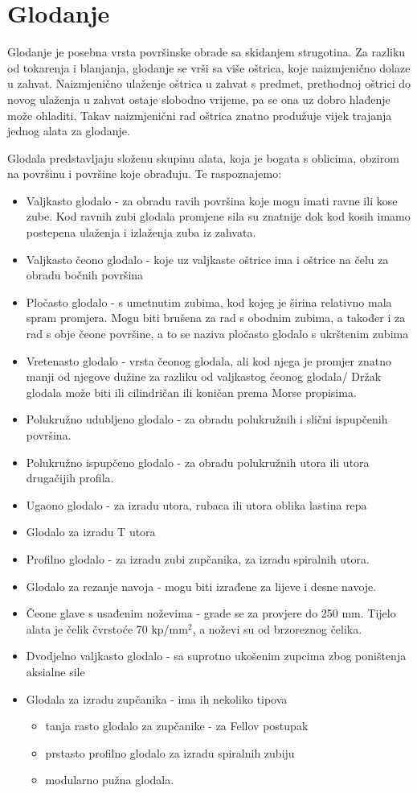 \documentclass[a4paper,12pt]{article}
\numberwithin{figure}{section}
\begin{document}
\section{Glodanje}
Glodanje je posebna vrsta površinske obrade sa skidanjem strugotina. Za razliku od tokarenja i blanjanja, glodanje se vrši sa više oštrica, koje naizmjenično dolaze u zahvat. Naizmjenično ulaženje oštrica u zahvat s predmet, prethodnoj oštrici do novog ulaženja u zahvat ostaje slobodno vrijeme, pa se ona uz dobro hlađenje može ohladiti. Takav naizmjenični rad oštrica znatno produžuje vijek trajanja jednog alata za glodanje.\par
Glodala predstavljaju složenu skupinu alata, koja je bogata s oblicima, obzirom na površinu i površine koje obrađuju. Te raspoznajemo:
\begin{itemize}
\item Valjkasto glodalo - za obradu ravih površina koje mogu imati ravne ili kose zube. Kod ravnih zubi glodala promjene sila su znatnije dok kod kosih imamo postepena ulaženja i izlaženja zuba iz zahvata.
\item Valjkasto čeono glodalo - koje uz valjkaste oštrice ima i oštrice na čelu za obradu bočnih površina
\item Pločasto glodalo - s umetnutim zubima, kod kojeg je širina relativno mala spram promjera. Mogu biti brušena za rad s obodnim zubima, a također i za rad s obje čeone površine, a to se naziva pločasto glodalo s ukrštenim zubima
\item Vretenasto glodalo - vrsta čeonog glodala, ali kod njega je promjer znatno manji od njegove dužine za razliku od valjkastog čeonog glodala/ Držak glodala može biti ili cilindričan ili koničan prema Morse propisima.
\item Polukružno udubljeno glodalo - za obradu polukružnih i slični ispupčenih površina.
\item Polukružno ispupčeno glodalo - za obradu polukružnih utora ili utora drugačijih profila.
\item Ugaono glodalo - za izradu utora, rubaca ili utora oblika lastina repa
\item Glodalo za izradu T utora
\item Profilno glodalo - za izradu zubi zupčanika, za izradu spiralnih utora.
\item Glodalo za rezanje navoja - mogu biti izrađene za lijeve i desne navoje.
\item Čeone glave s usađenim noževima - grade se za provjere do 250 mm. Tijelo alata je čelik čvrstoće 70 kp/mm$^{2}$, a noževi su od brzoreznog čelika.
\item Dvodjelno valjkasto glodalo - sa suprotno ukošenim zupcima zbog poništenja aksialne sile
\item  Glodala za izradu zupčanika - ima ih nekoliko tipova 
\begin{itemize}
\item tanja rasto glodalo za zupčanike - za Fellov postupak
\item prstasto profilno glodalo za izradu spiralnih zubiju
\item modularno pužna glodala.
\end{itemize}
\end{itemize}
\end{document}

